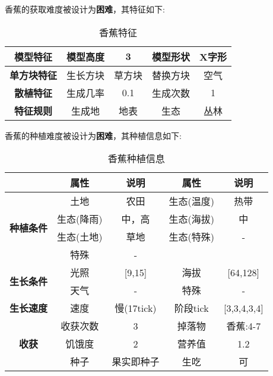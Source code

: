 香蕉的获取难度被设计为\textbf{困难}，其特征如下:
\begin{table}[H]
    \centering
    \caption{香蕉特征}
    \label{table:香蕉特征}
    \setlength{\tabcolsep}{4mm}
    \begin{tabular}{c|cc|cc}
        \toprule
        \textbf{模型特征}   & 模型高度 & 3      & 模型形状 & X字形 \\
        \midrule
        \textbf{单方块特征} & 生长方块 & 草方块 & 替换方块 & 空气  \\
        \midrule
        \textbf{散植特征}   & 生成几率 & 0.1    & 生成次数 & 1     \\
        \midrule
        \textbf{特征规则}   & 生成地   & 地表   & 生态     & 丛林  \\
        \bottomrule
    \end{tabular}
\end{table}


香蕉的种植难度被设计为\textbf{困难}，其种植信息如下:

\begin{table}[H]
    \centering
    \caption{香蕉种植信息}
    \label{table:香蕉种植信息}
    \setlength{\tabcolsep}{4mm}
    \begin{tabular}{c|cc|cc}
        \toprule
                                           & \textbf{属性} & \textbf{说明} & \textbf{属性} & \textbf{说明} \\
        \midrule
        \multirow{4}{*}{\textbf{种植条件}} & 土地          & 农田          & 生态(温度)    & 热带          \\
                                           & 生态(降雨)    & 中，高        & 生态(海拔)    & 中            \\
                                           & 生态(土地)    & 草地          & 生态(特殊)    & -             \\
                                           & 特殊          & -                                             \\
        \midrule
        \multirow{2}{*}{\textbf{生长条件}} & 光照          & [9,15]        & 海拔          & [64,128]      \\
                                           & 天气          & -             & 特殊          & -             \\
        \midrule
        \textbf{生长速度}                  & 速度          & 慢(17tick)    & 阶段tick      & [3,3,4,3,4]   \\
        \midrule
        \multirow{3}{*}{\textbf{收获}}     & 收获次数      & 3             & 掉落物        & 香蕉:4-7      \\
                                           & 饥饿度        & 2             & 营养值        & 1.2           \\
                                           & 种子          & 果实即种子    & 生吃          & 可            \\
        \bottomrule
    \end{tabular}
\end{table}

